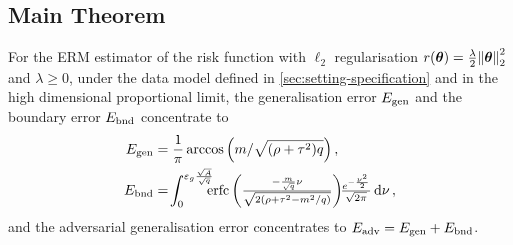 \documentclass[a0paper,fleqn]{betterportraitposter}
\theoremstyle{plain}
\theoremstyle{definition}
\theoremstyle{remark}
\begin{document}
{\begin{multicols}{3}
\section{Main Theorem}
For the ERM estimator of the risk function with \(\ell_2\) regularisation \(r(\boldsymbol{\theta}) = \frac{\lambda}{2} \norm{\boldsymbol{\theta}}_2^2\) and \(\lambda \geq 0\), under the data model defined in \cref{sec:setting-specification} and in the high dimensional proportional limit, the generalisation error \(E_{\mathrm{gen}}\) and the boundary error \(E_{\mathrm{bnd}}\) concentrate to
\begin{align}
    E_{\mathrm{gen}} &= \frac{1}{\pi} \arccos \qty( 
    {
        m / \sqrt{ (\rho + \tau^2) q}
    } 
    ) \,, \\
    E_{\mathrm{bnd}} &= \!
    \int_{0}^{\varepsilon_g \frac{\sqrt{A}}{\sqrt{q}}} \!\!\!\!
    {\textstyle
        \operatorname*{erfc}\left( \frac{ -\frac{m}{\sqrt{q}} \nu}{\sqrt{2 \qty(\rho + \tau^2 - m^2 / q)}} \right) 
        \!\! \frac{e^{-\frac{\nu^2}{2}}}{\sqrt{2\pi}} \dd{\nu}
    }
    \label{eq:adv-error-theorem-overlap} \,, 
\end{align}
and the adversarial generalisation error concentrates to \(E_{\mathrm{adv}} = E_{\mathrm{gen}} + E_{\mathrm{bnd}}\).


\end{multicols}}
\end{document}

